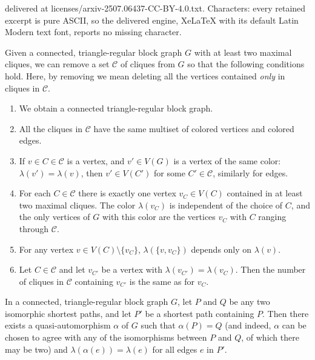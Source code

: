\documentclass[10pt,a4paper]{amsart}
\newcommand{\cC}{\mathcal{C}}
\begin{document}
delivered at licenses/arxiv-2507.06437-CC-BY-4.0.txt. Characters: every retained excerpt is pure ASCII, so the delivered engine, XeLaTeX with its default Latin Modern text font, reports no missing character.
\begin{proposition}\label{prop:removing-cliques}
    Given a connected, triangle-regular block graph $G$ with at least two maximal
    cliques, we can remove a set $\mathcal C$ of cliques from $G$ so that the
    following conditions hold. Here, by removing we mean deleting all
    the vertices contained {\em only} in cliques in $\mathcal{C}$. 
    \begin{enumerate}
        \item We obtain a connected triangle-regular block graph.
        \item All the cliques in $\mathcal{C}$ have the same multiset
	of colored vertices and colored edges.
        \item If $v\in C\in \mathcal{C}$ is a vertex, and $v' \in V(G)$ is a
	vertex of the same color: $\lambda(v')=\lambda(v)$, then $v'\in V(C')$ for some $C'\in \mathcal{C}$, similarly for edges.
        \item For each $C\in \mathcal{C}$ there is exactly one vertex
	$v_C\in V(C)$ contained in at least two maximal cliques. The
	color $\lambda(v_C)$  is independent of the choice of $C$, and
	the only vertices of $G$ with this color are the vertices
	$v_C$ with $C$ ranging through $\cC$.
        \item For any vertex $v\in V(C)\setminus \lbrace v_C\rbrace$,
	$\lambda(\{v,v_C\})$ depends only on $\lambda(v)$.
        \item Let $C\in \mathcal C$ and let $v_{C'}$ be a vertex with $\lambda(v_{C'}) = \lambda(v_C)$. Then the number of cliques in $\mathcal C$ containing $v_{C'}$ is the same as for $v_C$.
    \end{enumerate}
\end{proposition}

\begin{lemma}\label{lemma:moving-paths}
    In a connected, triangle-regular block graph $G$, let $P$ and $Q$ be
    any two isomorphic shortest paths, and let $P'$ be a shortest path
     containing $P$. Then there exists a quasi-automorphism
    $\alpha$ of $G$ such that $\alpha(P) = Q$ (and indeed, $\alpha$ can
    be chosen to agree with any of the isomorphisms between $P$ and $Q$,
    of which there may be two) and $\lambda(\alpha(e)) = \lambda(e)$
    for all edges $e$ in $P'$.
\end{lemma}
\end{document}
